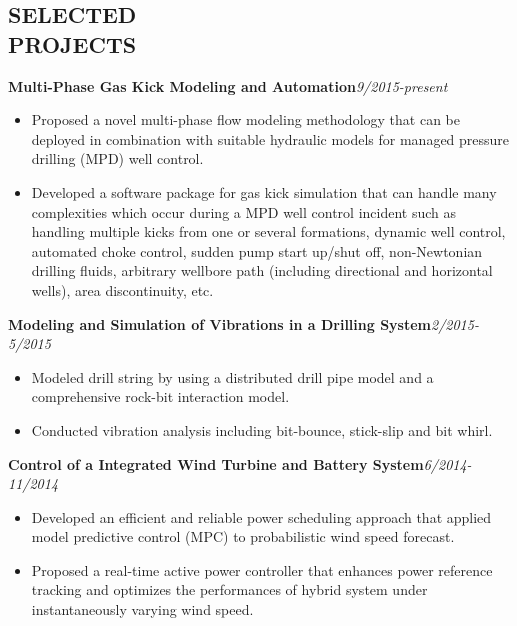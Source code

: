\documentclass[margin, 9pt]{res} %
\begin{document}
\begin{resume}
\section{SELECTED\\ PROJECTS}
{\textbf{Multi-Phase Gas Kick Modeling and Automation}}\hfill\textit{9/2015-present}\\
\vspace*{-10pt}
\begin{itemize}[leftmargin=*] \itemsep -3pt
\vspace*{-5pt}
	\item Proposed a novel multi-phase flow modeling methodology that can be deployed in combination with suitable hydraulic models for managed pressure drilling (MPD) well control.
	\item Developed a software package for gas kick simulation that can handle many complexities which occur during a MPD well control incident such as handling multiple kicks from one or several formations, dynamic well control, automated choke control, sudden pump start up/shut off, non-Newtonian drilling fluids, arbitrary wellbore path (including directional and horizontal wells), area discontinuity, etc.
\end{itemize}

\medskip
{\textbf{Modeling and Simulation of Vibrations in a Drilling System}}\hfill\textit{2/2015-5/2015}\\
\vspace*{-10pt}
\begin{itemize}[leftmargin=*] \itemsep -3pt
\vspace*{-5pt}
	\item Modeled drill string by using a distributed drill pipe model and a comprehensive rock-bit interaction model.
	\item Conducted vibration analysis including bit-bounce, stick-slip and bit whirl.
\end{itemize}

\medskip
{\textbf{Control of a Integrated Wind Turbine and Battery System}}\hfill\textit{6/2014-11/2014}\\
\vspace*{-10pt}
\begin{itemize}[leftmargin=*] \itemsep -3pt
\vspace*{-5pt}
	\item Developed an efficient and reliable power scheduling approach that applied model predictive control (MPC) to probabilistic wind speed forecast.
	\item Proposed a real-time active power controller that enhances power reference tracking and optimizes the performances of hybrid system under instantaneously varying wind speed.
\end{itemize}


\end{resume}
\end{document}

